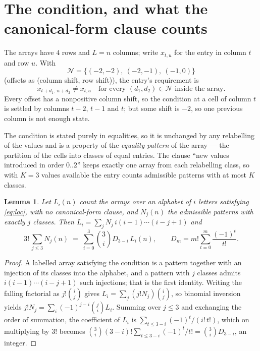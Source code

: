 \documentclass[11pt,a4paper]{article}
\theoremstyle{plain}
\newtheorem{lemma}[theorem]{Lemma}
\theoremstyle{definition}
\begin{document}
\section{The condition, and what the canonical-form clause counts}

The arrays have $4$ rows and $L=n$ columns; write $x_{t,u}$ for the entry in
column $t$ and row $u$. With
\[
\mathcal N=\{(-2,-2),\ (-2,-1),\ (-1,0)\}
\]
(offsets as (column shift, row shift)), the entry's requirement is
\begin{equation}\label{eq:loc}
x_{t+d_1,\,u+d_2}\ne x_{t,u}\quad\text{for every }(d_1,d_2)\in\mathcal N\text{ inside the array}.
\end{equation}
Every offset has a nonpositive column shift, so the condition at a cell of column $t$ is
settled by columns $t-2$, $t-1$ and $t$; but some shift is $-2$, so one previous column is not
enough state.

The condition is stated purely in equalities, so it is unchanged by any relabelling of the
values and is a property of the \emph{equality pattern} of the array --- the partition of
the cells into classes of equal entries. The clause ``new values introduced in order
$0..2$'' keeps exactly one array from each relabelling class, so with $K=3$ values
available the entry counts admissible patterns with at most $K$ classes.

\begin{lemma}\label{lem:inv}
Let $L_i(n)$ count the arrays over an alphabet of $i$ letters satisfying \eqref{eq:loc},
with no canonical-form clause, and $N_j(n)$ the admissible patterns with exactly $j$ classes.
Then $L_i=\sum_j N_j\,i(i-1)\cdots(i-j+1)$ and
\[
3!\,\sum_{j\le 3}N_j(n)\;=\;\sum_{i=0}^{3}\binom{3}{i}D_{3-i}\,L_i(n),
\qquad D_m=m!\sum_{t=0}^{m}\frac{(-1)^t}{t!} .
\]
\end{lemma}

\begin{proof}
A labelled array satisfying the condition is a pattern together with an injection of its
classes into the alphabet, and a pattern with $j$ classes admits $i(i-1)\cdots(i-j+1)$ such
injections; that is the first identity. Writing the falling factorial as $j!\binom{i}{j}$
gives $L_i=\sum_j(j!N_j)\binom{i}{j}$, so binomial inversion yields
$j!N_j=\sum_i(-1)^{j-i}\binom{j}{i}L_i$. Summing over $j\le3$ and exchanging the
order of summation, the coefficient of $L_i$ is $\sum_{t\le3-i}(-1)^t/(i!\,t!)$, which on
multiplying by $3!$ becomes
$\binom{3}{i}(3-i)!\sum_{t\le3-i}(-1)^t/t!=\binom{3}{i}D_{3-i}$, an
integer.
\end{proof}
\end{document}
